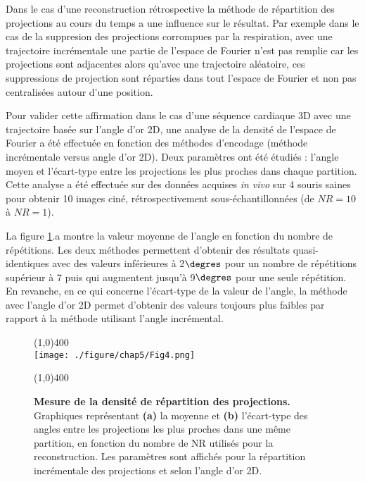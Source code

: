 Dans le cas d'une reconstruction rétrospective la méthode de répartition des projections au cours du temps a une influence sur le résultat. Par exemple dans le cas de la suppresion des projections corrompues par la respiration, avec une trajectoire incrémentale une partie de l'espace de Fourier n'est pas remplie car les projections sont adjacentes alors qu'avec une trajectoire aléatoire, ces suppressions de projection sont réparties dans tout l'espace de Fourier et non pas centralisées autour d'une position. 

Pour valider cette affirmation dans le cas d'une séquence cardiaque 3D avec une trajectoire basée sur l'angle d'or 2D, une analyse de la densité de l'espace de Fourier a été effectuée en fonction des méthodes d'encodage (méthode incrémentale versus angle d'or 2D). Deux paramètres ont été étudiés : l'angle moyen et l'écart-type entre les projections les plus proches dans chaque partition. Cette analyse a été effectuée sur des données acquises \textit{in vivo} sur 4 souris saines pour obtenir 10 images ciné, rétrospectivement sous-échantillonnées (de $NR = 10$ à $NR = 1$).

La figure \ref{fig:GoldVSIncNr}.a montre la valeur moyenne de l'angle en fonction du nombre de répétitions. Les deux méthodes permettent d'obtenir des résultats quasi-identiques avec des valeurs inférieures à 2$\degres$ pour un nombre de répétitions supérieur à 7 puis qui augmentent jusqu'à 9$\degres$ pour une seule répétition. En revanche, en ce qui concerne l'écart-type de la valeur de l'angle, la méthode avec l'angle d'or 2D permet d'obtenir des valeurs toujours plus faibles par rapport à la méthode utilisant l'angle incrémental.%

\begin{figure}[H]
\centering
\line(1,0){400} \\
\texttt{[image: ./figure/chap5/Fig4.png]}
\caption[Mesure de la densité de répartition des projections.]{\label{fig:GoldVSIncNr} \textbf{Mesure de la densité de répartition des projections.} Graphiques représentant \textbf{(a)} la moyenne et \textbf{(b)} l'écart-type des angles entre les projections les plus proches dans une même partition, en fonction du nombre de NR utilisés pour la reconstruction. Les paramètres sont affichés pour la répartition incrémentale des projections et selon l'angle d'or 2D.}
\line(1,0){400} \\ 
\end{figure}

